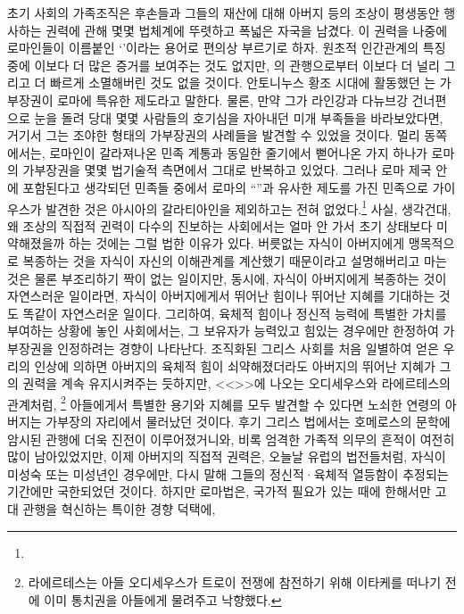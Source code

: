 초기 사회의 가족조직은
후손들과 그들의 재산에 대해
아버지 등의 조상이 평생동안 행사하는 권력에 관해
몇몇 법체계에 뚜렷하고 폭넓은 자국을 남겼다.
이 권력을 나중에 로마인들이 이름붙인
`'이라는 용어로 편의상 부르기로 하자.
원초적 인간관계의 특징 중에 이보다 더 많은 증거를 보여주는 것도 없지만,
의 관행으로부터 이보다 더 널리 그리고 더 빠르게
소멸해버린 것도 없을 것이다.
안토니누스 황조 시대에 활동했던 는
가부장권이 로마에 특유한 제도라고 말한다.
물론, 만약 그가 라인강과 다뉴브강 건너편으로 눈을 돌려
당대 몇몇 사람들의 호기심을 자아내던 미개 부족들을 바라보았다면,
거기서 그는 조야한 형태의 가부장권의 사례들을 발견할 수 있었을 것이다.
멀리 동쪽에서는, 로마인이 갈라져나온 민족 계통과 동일한 줄기에서
뻗어나온 가지 하나가 로마의 가부장권을 몇몇 법기술적 측면에서
그대로 반복하고 있었다.
그러나
로마 제국 안에 포함된다고 생각되던 민족들 중에서
로마의 ``''과 유사한 제도를 가진 민족으로
가이우스가
발견한 것은
아시아의 갈라티아인을 제외하고는
전혀 없었다.\footnote{}
사실, 생각건대,
왜 조상의 직접적 귄력이
다수의 진보하는 사회에서는
얼마 안 가서 초기 상태보다 미약해졌을까 하는 것에는
그럴 법한 이유가 있다.
버릇없는 자식이 아버지에게 맹목적으로 복종하는 것을
자식이 자신의 이해관계를 계산했기 때문이라고 설명해버리고 마는 것은
물론 부조리하기 짝이 없는 일이지만,
동시에, 자식이 아버지에게 복종하는 것이 자연스러운 일이라면,
자식이 아버지에게서 뛰어난 힘이나 뛰어난 지혜를 기대하는 것도 똑같이
자연스러운 일이다.
그리하여,
육체적 힘이나 정신적 능력에 특별한 가치를 부여하는 상황에 놓인 사회에서는,
그 보유자가 능력있고 힘있는 경우에만 한정하여
가부장권을
인정하려는 경향이 나타난다.
조직화된 그리스 사회를 처음 일별하여 얻은 우리의 인상에 의하면
아버지의 육체적 힘이 쇠약해졌더라도 아버지의 뛰어난 지혜가
그의 권력을 계속 유지시켜주는 듯하지만,
<<>>에 나오는
오디세우스와 라에르테스의 관계처럼,%
\footnote{라에르테스는 아들 오디세우스가 트로이 전쟁에 참전하기 위해
이타케를 떠나기 전에 이미 통치권을 아들에게 물려주고 낙향했다.}
아들에게서 특별한 용기와 지혜를 모두 발견할 수 있다면
노쇠한 연령의 아버지는 가부장의 자리에서 물러났던 것이다.
후기 그리스 법에서는
호메로스의 문학에 암시된 관행에 더욱 진전이 이루어졌거니와,
비록 엄격한 가족적 의무의 흔적이 여전히 많이 남아있었지만,
이제 아버지의 직접적 권력은, 오늘날 유럽의 법전들처럼,
자식이 미성숙 또는 미성년인 경우에만, 다시 말해 그들의 정신적^^b7육체적
열등함이 추정되는 기간에만 국한되었던 것이다.
하지만 로마법은,
국가적 필요가 있는 때에 한해서만 고대 관행을 혁신하는 특이한 경향 덕택에,
